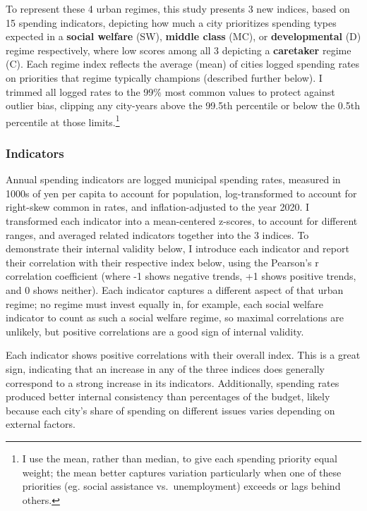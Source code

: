 \documentclass[preprint, 3p,
authoryear]{elsarticle} %
\begin{document}
To represent these 4 urban regimes, this study presents 3 new indices,
based on 15 spending indicators, depicting how much a city prioritizes
spending types expected in a \textbf{social welfare} (SW),
\textbf{middle class} (MC), or \textbf{developmental} (D) regime
respectively, where low scores among all 3 depicting a
\textbf{caretaker} regime (C). Each regime index reflects the average
(mean) of cities logged spending rates on priorities that regime
typically champions (described further below). I trimmed all logged
rates to the 99\% most common values to protect against outlier bias,
clipping any city-years above the 99.5th percentile or below the 0.5th
percentile at those limits.\footnote{I use the mean, rather than median,
  to give each spending priority equal weight; the mean better captures
  variation particularly when one of these priorities (eg. social
  assistance vs.~unemployment) exceeds or lags behind others.}

\hypertarget{indicators}{%
\subsubsection{Indicators}\label{indicators}}

Annual spending indicators are logged municipal spending rates, measured
in 1000s of yen per capita to account for population, log-transformed to
account for right-skew common in rates, and inflation-adjusted to the
year 2020. I transformed each indicator into a mean-centered z-scores,
to account for different ranges, and averaged related indicators
together into the 3 indices. To demonstrate their internal validity
below, I introduce each indicator and report their correlation with
their respective index below, using the Pearson's r correlation
coefficient (where -1 shows negative trends, +1 shows positive trends,
and 0 shows neither). Each indicator captures a different aspect of that
urban regime; no regime must invest equally in, for example, each social
welfare indicator to count as such a social welfare regime, so maximal
correlations are unlikely, but positive correlations are a good sign of
internal validity.

Each indicator shows positive correlations with their overall index.
This is a great sign, indicating that an increase in any of the three
indices does generally correspond to a strong increase in its
indicators. Additionally, spending rates produced better internal
consistency than percentages of the budget, likely because each city's
share of spending on different issues varies depending on external
factors.
\end{document}
